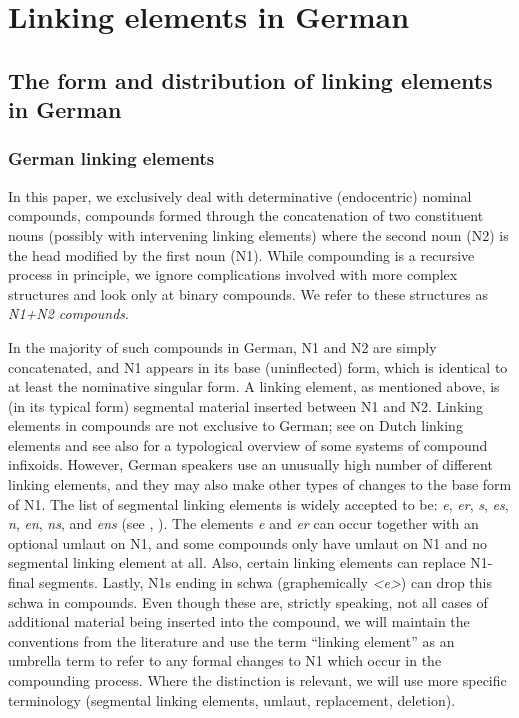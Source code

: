 \section{Linking elements in German}
\label{sec:linkingelementsingerman}

\subsection{The form and distribution of linking elements in German}
\label{sec:theformanddistributionoflinkingelementsingerman}

\subsubsection{German linking elements}

In this paper, we exclusively deal with determinative (endocentric) nominal compounds, \ie compounds formed through the concatenation of two constituent nouns (possibly with intervening linking elements) where the second noun (N2) is the head modified by the first noun (N1).
While compounding is a recursive process in principle, we ignore complications involved with more complex structures and look only at binary compounds.
We refer to these structures as \textit{N1+N2 compounds}.

In the majority of such compounds in German, N1 and N2 are simply concatenated, and N1 appears in its base (uninflected) form, which is identical to at least the nominative singular form.
A linking element, as mentioned above, is (in its typical form) segmental material inserted between N1 and N2.
Linking elements in compounds are not exclusive to German; see \citet{SchreuderEa1998,BangaEa2013a,BangaEa2013b} on Dutch linking elements and see also \citet[27]{KrottEa2007} for a typological overview of some systems of compound infixoids.
However, German speakers use an unusually high number of different linking elements, and they may also make other types of changes to the base form of N1.
The list of segmental linking elements is widely accepted to be: \textit{e}, \textit{er}, \textit{s}, \textit{es}, \textit{n}, \textit{en}, \textit{ns}, and \textit{ens} (see \citealt[31]{Neef2015}, \citealt{KrottEa2007}).
The elements \textit{e} and \textit{er} can occur together with an optional umlaut on N1, and some compounds only have umlaut on N1 and no segmental linking element at all.
Also, certain linking elements can replace N1-final segments.
Lastly, N1s ending in schwa (graphemically \textit{<e>}) can drop this schwa in compounds.
Even though these are, strictly speaking, not all cases of additional material being inserted into the compound, we will maintain the conventions from the literature and use the term ``linking element'' as an umbrella term to refer to any formal changes to N1 which occur in the compounding process.
Where the distinction is relevant, we will use more specific terminology (\ie segmental linking elements, umlaut, replacement, deletion).

